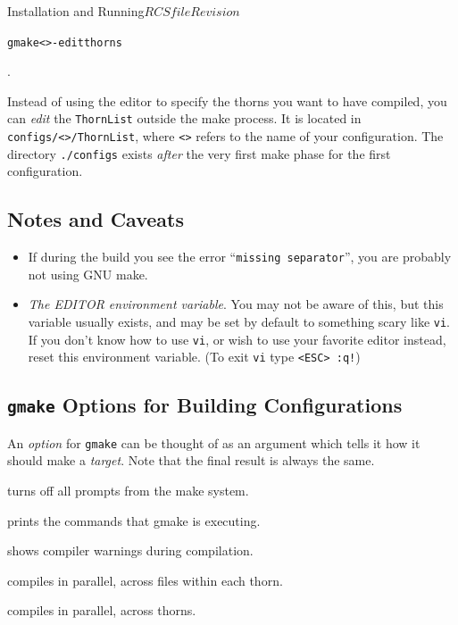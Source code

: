 \begin{cactuspart}{Installation and Running}{$RCSfile$}{$Revision$}
\begin{alltt}
gmake <>-editthorns
\end{alltt}.

Instead of using the editor to specify the thorns you want to
  have compiled, you can \emph{edit} the \texttt{ThornList} outside
  the make process. It is located in \texttt{configs/<>/ThornList},
  where \texttt{<>} refers to the name of your configuration.
  The directory \texttt{./configs} exists \emph{after} the very first
  make phase for the first configuration.

\subsection{Notes and Caveats}
\begin{itemize}
\item{} If during the build you see the error ``\texttt{missing
    separator}'', you are probably not using GNU make.
\item{} \textit{The EDITOR environment variable}. You may not be aware of
  this, but this variable usually exists, and may be set by default to
  something scary like \texttt{vi}. If you don't know how to use \texttt{vi},
  or wish to
  use your favorite editor instead, reset this environment variable.
  (To exit \texttt{vi} type \texttt{<ESC> :q!})
\end{itemize}

\subsection{\texttt{gmake} Options for Building Configurations}
\label{sec:gmopfobuco}

An \textit{option} for \texttt{gmake} can be thought of as an argument which tells
it how it should make a \textit{target}. Note that the final result is always
the same.

\begin{Lentry}
\item [\texttt{gmake <\var{target}> PROMPT=no}] turns off all prompts from the
make system.
\item [\texttt{gmake <\var{target}> SILENT=no}] prints the commands that gmake
is executing.
\item [\texttt{gmake <\var{target}> WARN=yes}] shows compiler warnings during
compilation.
\item [\texttt{gmake <\var{target}> FJOBS=<\var{number}>}] compiles in parallel,
across files within each thorn.
\item [\texttt{gmake <\var{target}> TJOBS=<\var{number}>}] compiles in parallel,
across thorns.


\end{Lentry}
\end{cactuspart}
